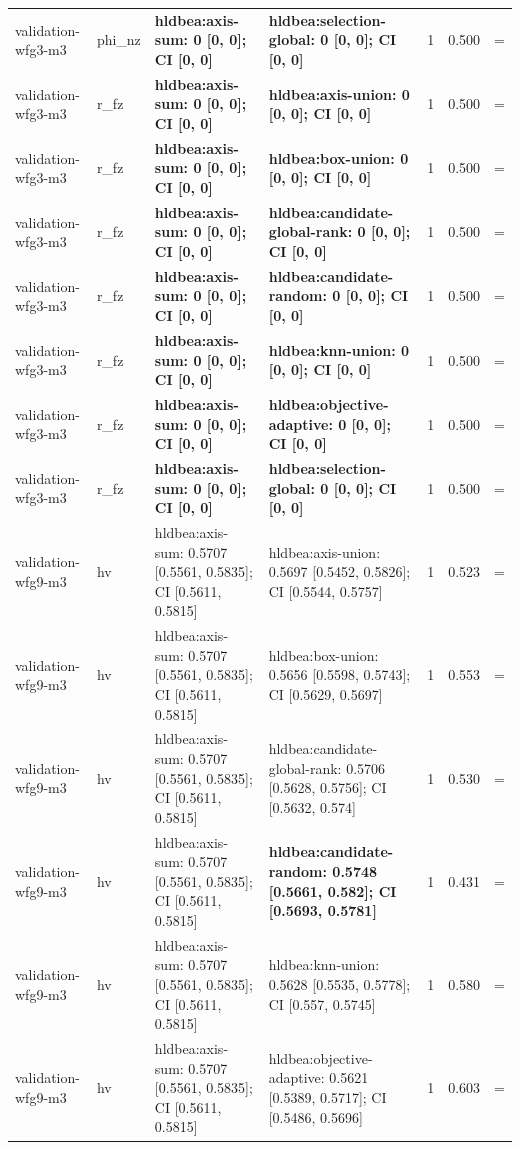 \begin{tabular}{llllrrc}
validation-wfg3-m3 & phi\_nz & \textbf{hldbea:axis-sum: 0 [0, 0]; CI [0, 0]} & \textbf{hldbea:selection-global: 0 [0, 0]; CI [0, 0]} & 1 & 0.500 & = \\
validation-wfg3-m3 & r\_fz & \textbf{hldbea:axis-sum: 0 [0, 0]; CI [0, 0]} & \textbf{hldbea:axis-union: 0 [0, 0]; CI [0, 0]} & 1 & 0.500 & = \\
validation-wfg3-m3 & r\_fz & \textbf{hldbea:axis-sum: 0 [0, 0]; CI [0, 0]} & \textbf{hldbea:box-union: 0 [0, 0]; CI [0, 0]} & 1 & 0.500 & = \\
validation-wfg3-m3 & r\_fz & \textbf{hldbea:axis-sum: 0 [0, 0]; CI [0, 0]} & \textbf{hldbea:candidate-global-rank: 0 [0, 0]; CI [0, 0]} & 1 & 0.500 & = \\
validation-wfg3-m3 & r\_fz & \textbf{hldbea:axis-sum: 0 [0, 0]; CI [0, 0]} & \textbf{hldbea:candidate-random: 0 [0, 0]; CI [0, 0]} & 1 & 0.500 & = \\
validation-wfg3-m3 & r\_fz & \textbf{hldbea:axis-sum: 0 [0, 0]; CI [0, 0]} & \textbf{hldbea:knn-union: 0 [0, 0]; CI [0, 0]} & 1 & 0.500 & = \\
validation-wfg3-m3 & r\_fz & \textbf{hldbea:axis-sum: 0 [0, 0]; CI [0, 0]} & \textbf{hldbea:objective-adaptive: 0 [0, 0]; CI [0, 0]} & 1 & 0.500 & = \\
validation-wfg3-m3 & r\_fz & \textbf{hldbea:axis-sum: 0 [0, 0]; CI [0, 0]} & \textbf{hldbea:selection-global: 0 [0, 0]; CI [0, 0]} & 1 & 0.500 & = \\
validation-wfg9-m3 & hv & hldbea:axis-sum: 0.5707 [0.5561, 0.5835]; CI [0.5611, 0.5815] & hldbea:axis-union: 0.5697 [0.5452, 0.5826]; CI [0.5544, 0.5757] & 1 & 0.523 & = \\
validation-wfg9-m3 & hv & hldbea:axis-sum: 0.5707 [0.5561, 0.5835]; CI [0.5611, 0.5815] & hldbea:box-union: 0.5656 [0.5598, 0.5743]; CI [0.5629, 0.5697] & 1 & 0.553 & = \\
validation-wfg9-m3 & hv & hldbea:axis-sum: 0.5707 [0.5561, 0.5835]; CI [0.5611, 0.5815] & hldbea:candidate-global-rank: 0.5706 [0.5628, 0.5756]; CI [0.5632, 0.574] & 1 & 0.530 & = \\
validation-wfg9-m3 & hv & hldbea:axis-sum: 0.5707 [0.5561, 0.5835]; CI [0.5611, 0.5815] & \textbf{hldbea:candidate-random: 0.5748 [0.5661, 0.582]; CI [0.5693, 0.5781]} & 1 & 0.431 & = \\
validation-wfg9-m3 & hv & hldbea:axis-sum: 0.5707 [0.5561, 0.5835]; CI [0.5611, 0.5815] & hldbea:knn-union: 0.5628 [0.5535, 0.5778]; CI [0.557, 0.5745] & 1 & 0.580 & = \\
validation-wfg9-m3 & hv & hldbea:axis-sum: 0.5707 [0.5561, 0.5835]; CI [0.5611, 0.5815] & hldbea:objective-adaptive: 0.5621 [0.5389, 0.5717]; CI [0.5486, 0.5696] & 1 & 0.603 & = \\

\end{tabular}
